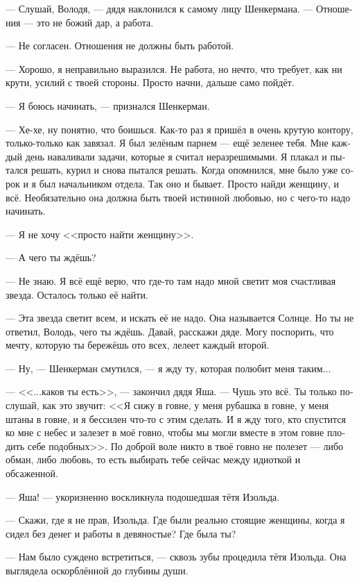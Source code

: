 \documentclass[a5paper,12pt,fleqn]{extbook}\usepackage{cooltooltips}\usepackage{polyglossia}\setdefaultlanguage[babelshorthands=true]{russian}\setotherlanguage{english}\defaultfontfeatures{Ligatures=TeX,Mapping=tex-text} \usepackage{xcolor}\definecolor{lightgray}{HTML}{bbbbbb}\color{lightgray}\newcommand{\ml}[3]{\textenglish{\textcolor{black}{#3}}}
\begin{document}
--- Слушай, Володя, --- дядя наклонился к самому лицу Шенкермана.
--- Отношения --- это не божий дар, а работа.

--- Не согласен.
Отношения не должны быть работой.

--- Хорошо, я неправильно выразился.
Не работа, но нечто, что требует, как ни крути, усилий с твоей стороны.
Просто начни, дальше само пойдёт.

--- Я боюсь начинать, --- признался Шенкерман.

--- Хе-хе, ну понятно, что боишься.
Как-то раз я пришёл в очень крутую контору, только-только как завязал.
Я был зелёным парнем --- ещё зеленее тебя.
Мне каждый день наваливали задачи, которые я считал неразрешимыми.
Я плакал и пытался решать, курил и снова пытался решать.
Когда опомнился, мне было уже сорок и я был начальником отдела.
Так оно и бывает.
Просто найди женщину, и всё.
Необязательно она должна быть твоей истинной любовью, но с чего-то надо начинать.

--- Я не хочу <<просто найти женщину>>.

--- А чего ты ждёшь?

--- Не знаю.
Я всё ещё верю, что где-то там надо мной светит моя счастливая звезда.
Осталось только её найти.

--- Эта звезда светит всем, и искать её не надо.
Она называется Солнце.
Но ты не ответил, Володь, чего ты ждёшь.
Давай, расскажи дяде.
Могу поспорить, что мечту, которую ты бережёшь ото всех, лелеет каждый второй.

--- Ну, --- Шенкерман смутился, --- я жду ту, которая полюбит меня таким...

---  <<...каков ты есть>>, --- закончил дядя Яша.
--- Чушь это всё.
Ты только послушай, как это звучит: <<Я сижу в говне, у меня рубашка в говне, у меня штаны в говне, и я бессилен что-то с этим сделать.
И я жду того, кто спустится ко мне с небес и залезет в моё говно, чтобы мы могли вместе в этом говне плодить себе подобных>>.
По доброй воле никто в твоё говно не полезет --- либо обман, либо любовь, то есть выбирать тебе сейчас между идиоткой и обсаженной.

--- Яша! --- укоризненно воскликнула подошедшая тётя Изольда.

--- Скажи, где я не прав, Изольда.
Где были реально стоящие женщины, когда я сидел без денег и работы в девяностые?
Где была ты?

--- Нам было суждено встретиться, --- сквозь зубы процедила тётя Изольда.
Она выглядела оскорблённой до глубины души.
\end{document}
